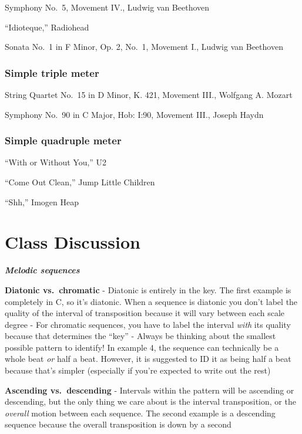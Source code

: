\documentclass{book}
\begin{document}
Symphony No.~5, Movement IV., Ludwig van Beethoven

``Idioteque,'' Radiohead

Sonata No.~1 in F Minor, Op. 2, No.~1, Movement I., Ludwig van Beethoven

\hypertarget{simple-triple-meter}{%
\subsection{Simple triple meter}\label{simple-triple-meter}}

String Quartet No.~15 in D Minor, K. 421, Movement III., Wolfgang A. Mozart

Symphony No.~90 in C Major, Hob: I:90, Movement III., Joseph Haydn

\hypertarget{simple-quadruple-meter}{%
\subsection{Simple quadruple meter}\label{simple-quadruple-meter}}

``With or Without You,'' U2

``Come Out Clean,'' Jump Little Children

``Shh,'' Imogen Heap

\hypertarget{class-discussion-11}{%
\chapter{Class Discussion}\label{class-discussion-11}}

\textbf{\emph{Melodic sequences}}

\textbf{Diatonic vs.~chromatic} - Diatonic is entirely in the key. The first
example is completely in C, so it's diatonic. When a sequence is diatonic you
don't label the quality of the interval of transposition because it will vary
between each scale degree - For chromatic sequences, you have to label the
interval \emph{with} its quality because that determines the ``key'' - Always
be thinking about the smallest possible pattern to identify! In example 4, the
sequence can technically be a whole beat \emph{or} half a beat. However, it is
suggested to ID it as being half a beat because that's simpler (especially if
you're expected to write out the rest)

\textbf{Ascending vs.~descending} - Intervals within the pattern will be
ascending or descending, but the only thing we care about is the interval
transposition, or the \emph{overall} motion between each sequence. The second
example is a descending sequence because the overall transposition is down by
a second
\end{document}
